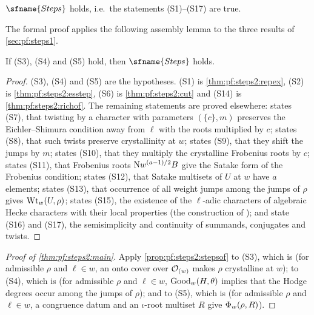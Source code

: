 \begin{theorem}\label{thm:pf:steps2:main}
$\sfname{Steps}$ holds, i.e.\ the statements \textup{(S1)--(S17)} are true.
\end{theorem}

The formal proof applies the following assembly lemma to the three results of
\cref{sec:pf:steps1}.

\begin{proposition}\label{prop:pf:steps2:stepsof}
If \textup{(S3)}, \textup{(S4)} and \textup{(S5)} hold, then $\sfname{Steps}$ holds.
\end{proposition}

\begin{proof}
(S3), (S4) and (S5) are the hypotheses. (S1) is \cref{thm:pf:steps2:repex}, (S2) is
\cref{thm:pf:steps2:esstep}, (S6) is \cref{thm:pf:steps2:cut} and (S14) is
\cref{thm:pf:steps2:richof}. The remaining statements are proved elsewhere:
 states (S7), that twisting by a character with parameters
$(\{c\},m)$ preserves the Eichler--Shimura condition away from $\ell$ with the roots multiplied by
$c$;  states (S8), that such twists preserve
crystallinity at $w$;  states (S9), that they shift the jumps
by $m$;  states (S10), that they multiply the crystalline
Frobenius roots by $c$;  states (S11), that Frobenius roots
$\mathrm{N}w^{(a-1)/2}B$ give the Satake form of the Frobenius condition;
 states (S12), that Satake multisets of $U$ at $w$ have $a$
elements;  states (S13), that occurrence of all weight
jumps among the jumps of $\rho$ gives $\mathrm{Wt}_w(U,\rho)$;
 states (S15), the existence of the $\ell$-adic characters of
algebraic Hecke characters with their local properties (the construction of \cite{Serre1968});
 and 
state (S16) and (S17), the semisimplicity and continuity of summands, conjugates and twists.
\end{proof}

\begin{proof}[Proof of \cref{thm:pf:steps2:main}]
Apply \cref{prop:pf:steps2:stepsof} to (S3), which is
 (for admissible $\rho$ and $\ell\in w$, an onto cover
over $\mathcal{O}_{(w)}$ makes $\rho$ crystalline at $w$); to (S4), which is
 (for admissible $\rho$ and $\ell\in w$,
$\mathrm{Good}_w(H,\theta)$ implies that the Hodge degrees occur among the jumps of $\rho$); and to
(S5), which is  (for admissible $\rho$ and
$\ell\in w$, a congruence datum and an $\iota$-root multiset $R$ give $\Phi_w(\rho,R)$).
\end{proof}

